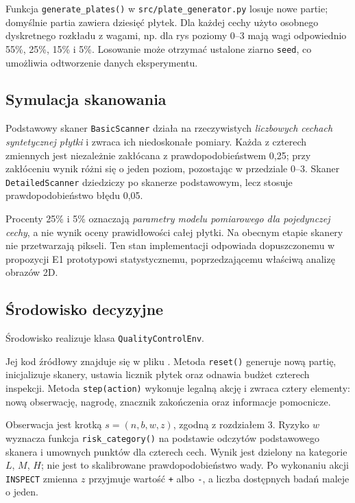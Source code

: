 \documentclass[12pt]{article}
\begin{document}
Funkcja \texttt{generate\_plates()} w \texttt{src/plate\_generator.py} losuje nowe partie; domyślnie partia zawiera dziesięć płytek. Dla każdej cechy użyto osobnego dyskretnego rozkładu z wagami, np. dla rys poziomy 0--3 mają wagi odpowiednio 55\%, 25\%, 15\% i 5\%. Losowanie może otrzymać ustalone ziarno \texttt{seed}, co umożliwia odtworzenie danych eksperymentu.

\subsection{Symulacja skanowania}

Podstawowy skaner \texttt{BasicScanner} działa na rzeczywistych \emph{liczbowych cechach syntetycznej płytki} i zwraca ich niedoskonałe pomiary. Każda z czterech zmiennych jest niezależnie zakłócana z prawdopodobieństwem 0,25; przy zakłóceniu wynik różni się o jeden poziom, pozostając w przedziale 0--3. Skaner \texttt{DetailedScanner} dziedziczy po skanerze podstawowym, lecz stosuje prawdopodobieństwo błędu 0,05.

Procenty 25\% i 5\% oznaczają \emph{parametry modelu pomiarowego dla pojedynczej cechy}, a nie wynik oceny prawidłowości całej płytki. Na obecnym etapie skanery nie przetwarzają pikseli. Ten stan implementacji odpowiada dopuszczonemu w propozycji E1 prototypowi statystycznemu, poprzedzającemu właściwą analizę obrazów 2D.

\subsection{Środowisko decyzyjne}

Środowisko realizuje klasa \texttt{QualityControlEnv}.\par\noindent Jej kod źródłowy znajduje się w pliku . Metoda \texttt{reset()} generuje nową partię, inicjalizuje skanery, ustawia licznik płytek oraz odnawia budżet czterech inspekcji. Metoda \texttt{step(action)} wykonuje legalną akcję i zwraca cztery elementy: nową obserwację, nagrodę, znacznik zakończenia oraz informacje pomocnicze.

Obserwacja jest krotką \(s=(n,b,w,z)\), zgodną z rozdziałem 3. Ryzyko \(w\) wyznacza funkcja \texttt{risk\_category()} na podstawie odczytów podstawowego skanera i umownych punktów dla czterech cech. Wynik jest dzielony na kategorie \(L\), \(M\), \(H\); nie jest to skalibrowane prawdopodobieństwo wady. Po wykonaniu akcji \texttt{INSPECT} zmienna \(z\) przyjmuje wartość \texttt{+} albo \texttt{-}, a liczba dostępnych badań maleje o jeden.
\end{document}
